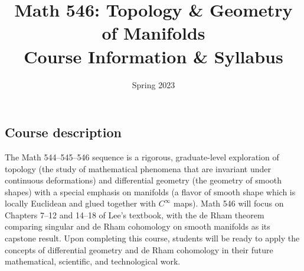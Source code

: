 \documentclass[11pt,twoside]{amsart}
\title{Math 546: Topology \& Geometry of Manifolds\\ Course Information \& Syllabus}
\author[Math 546:  Manifolds]{Spring 2023}
\begin{document}
\maketitle

\thispagestyle{empty}

\vspace{-.5cm}

\begin{center}
\end{center}

\smallskip

\subsection*{Course description}
The Math 544--545--546 sequence is a rigorous, graduate-level exploration of topology (the study of mathematical phenomena that are invariant under continuous deformations) and differential geometry (the geometry of smooth shapes) with a special emphasis on manifolds (a flavor of smooth shape which is locally Euclidean and glued together with $C^\infty$ maps). Math 546 will focus on Chapters 7--12 and 14--18 of Lee's textbook, with the de Rham theorem comparing singular and de Rham cohomology on smooth manifolds as its capstone result. Upon completing this course, students will be ready to apply the concepts of differential geometry and de Rham cohomology in their future mathematical, scientific, and technological work.
\end{document}
